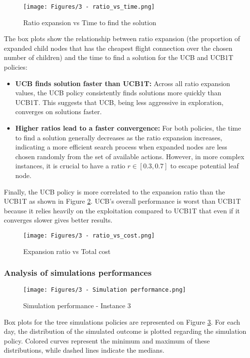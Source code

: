 \begin{figure}[!ht]
    \centering
    \texttt{[image: Figures/3 - ratio\_vs\_time.png]}
    \caption{Ratio expansion vs Time to find the solution}
    \label{fig:Ratio vs Time}
\end{figure}

The box plots show the relationship between ratio expansion (the proportion of expanded child nodes that has the cheapest flight connection over the chosen number of children) and the time to find a solution for the UCB and UCB1T policies:

\begin{itemize}
    \item \textbf{UCB finds solution faster than UCB1T:}
          Across all ratio expansion values, the UCB policy consistently finds solutions more quickly than UCB1T. This suggests that UCB, being less aggressive in exploration, converges on solutions faster.


    \item \textbf{Higher ratios lead to a faster convergence:}
          For both policies, the time to find a solution generally decreases as the ratio expansion increases, indicating a more efficient search process when expanded nodes are less chosen randomly from the set of available actions. However, in more complex instances, it is crucial to have a ratio $r \in [0.3,0.7]$ to escape potential leaf node.
\end{itemize}

Finally, the UCB policy is more correlated to the expansion ratio than the UCB1T as shown in Figure \ref{fig:ratio_vs_cost_3}. UCB's overall performance is worst than UCB1T because it relies heavily on the exploitation compared to UCB1T that even if it converges slower gives better results.

\begin{figure}[!ht]
    \centering
    \texttt{[image: Figures/3 - ratio\_vs\_cost.png]}
    \caption{Expansion ratio vs Total cost}
    \label{fig:ratio_vs_cost_3}
\end{figure}
\newpage
\newpage
\subsubsection*{Analysis of simulations performances}
\begin{figure}[!ht]
    \centering
    \texttt{[image: Figures/3 - Simulation performance.png]}
    \caption{Simulation performance - Instance 3}
    \label{fig:sim_perf_3}
\end{figure}
Box plots for the tree simulations policies are represented on Figure \ref{fig:sim_perf_3}. For each day, the distribution of the simulated outcome is plotted regarding the simulation policy. Colored curves represent the minimum and maximum of these distributions, while dashed lines indicate the medians.

